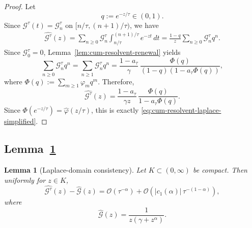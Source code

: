 \documentclass[letterpaper]{article}
\numberwithin{equation}{section}
\newtheorem{lemma}[theorem]{Lemma}
\theoremstyle{definition}
\theoremstyle{remark}
\begin{document}
\begin{proof}
Let
\[
  q:=e^{-z/\tau}\in(0,1).
\]
Since $\mathcal G^\tau(t)=\mathcal G_n^\tau$ on $[n/\tau,(n+1)/\tau)$, we have
\begin{align*}
  \widehat{\mathcal G^\tau}(z)
  =
  \sum_{n\ge0}\mathcal G_n^\tau
  \int_{n/\tau}^{(n+1)/\tau}e^{-zt}\,dt
  =
  \frac{1-q}{z}\sum_{n\ge0}\mathcal G_n^\tau q^n.
\end{align*}
Since $\mathcal G_0^\tau=0$, Lemma~\ref{lem:cum-resolvent-renewal} yields
\[
  \sum_{n\ge0}\mathcal G_n^\tau q^n
  =
  \sum_{n\ge1}\mathcal G_n^\tau q^n
  =
  \frac{1-a_\tau}{\gamma}\,
  \frac{\Phi(q)}{(1-q)(1-a_\tau\Phi(q))},
\]
where $\Phi(q):=\sum_{m\ge1}\varphi_m q^m$. Therefore,
\[
  \widehat{\mathcal G^\tau}(z)
  =
  \frac{1-a_\tau}{\gamma z}\,
  \frac{\Phi(q)}{1-a_\tau\Phi(q)}.
\]
Since $\Phi(e^{-z/\tau})=\hat\varphi(z/\tau)$, this is exactly
\eqref{eq:cum-resolvent-laplace-simplified}.
\end{proof}


\subsection{Lemma~\ref{lem:cum-resolvent-laplace-domain-comparison}}\label{app:proof-cum-resolvent-laplace-domain-comparison}

\begin{lemma}[Laplace-domain consistency]
\label{lem:cum-resolvent-laplace-domain-comparison}
Let $K\subset(0,\infty)$ be compact. Then uniformly for $z\in K$,
\[
  \widehat{\mathcal G^\tau}(z)-\widehat{\mathcal G}(z)
  =
  \mathcal O(\tau^{-\alpha})
  +
  \mathcal O\!\left(|c_1(\alpha)|\,\tau^{-(1-\alpha)}\right),
\]
where
\[
  \widehat{\mathcal G}(z)=\frac{1}{z(\gamma+z^\alpha)}.
\]
\end{lemma}
\end{document}
